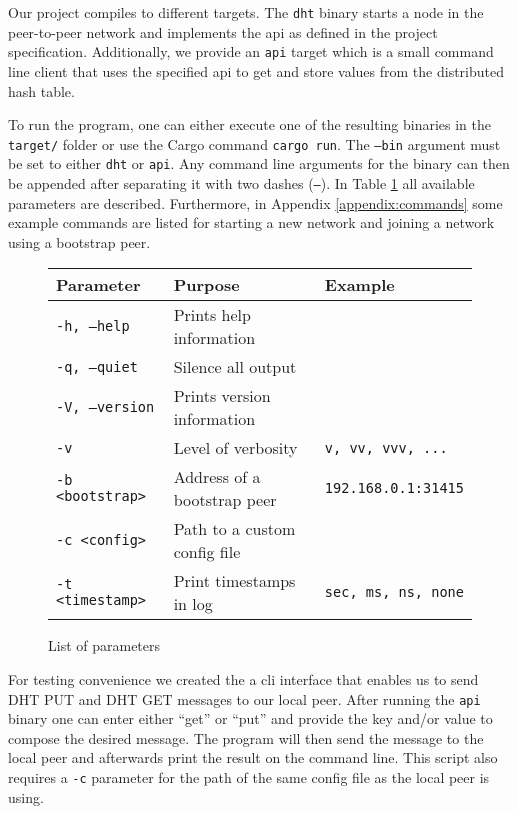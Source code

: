 \documentclass[a4paper, 11pt]{article}
\begin{document}
    Our project compiles to different targets. The \texttt{dht} binary starts a node in the peer-to-peer network and implements the api as defined in the project specification. Additionally, we provide an \texttt{api} target which is a small command line client that uses the specified api to get and store values from the distributed hash table.
    
    To run the program, one can either execute one of the resulting binaries in the \texttt{target/} folder or use the Cargo command \texttt{cargo run}. The \texttt{--bin} argument must be set to either \texttt{dht} or \texttt{api}. Any command line arguments for the binary can then be appended after separating it with two dashes (\texttt{--}). In Table \ref{table:parameters} all available parameters are described. Furthermore, in Appendix \ref{appendix:commands} some example commands are listed for starting a new network and joining a network using a bootstrap peer.
    
    \begin{figure}[H]
        \begin{longtable}{l l l}
            \toprule
            \textbf{Parameter} & \textbf{Purpose} & \textbf{Example} \\
            \midrule
            \texttt{-h, --help}     & Prints help information        & \\
            \texttt{-q, --quiet}    & Silence all output             & \\
            \texttt{-V, --version}  & Prints version information     & \\
            \texttt{-v}             & Level of verbosity             & \texttt{v, vv, vvv, ...} \\
            \texttt{-b <bootstrap>} & Address of a bootstrap peer    & \texttt{192.168.0.1:31415} \\
            \texttt{-c <config>}    & Path to a custom config file   & \\
            \texttt{-t <timestamp>} & Print timestamps in log        & \texttt{sec, ms, ns, none} \\
            \bottomrule
        \end{longtable}
        \caption{List of parameters}
        \label{table:parameters}
    \end{figure}
    
    For testing convenience we created the a cli interface that enables us to send DHT PUT and DHT GET messages to our local peer. After running the \texttt{api} binary one can enter either ``get'' or ``put'' and provide the key and/or value to compose the desired message. The program will then send the message to the local peer and afterwards print the result on the command line. This script also requires a \texttt{-c} parameter for the path of the same config file as the local peer is using.
    
\end{document}
